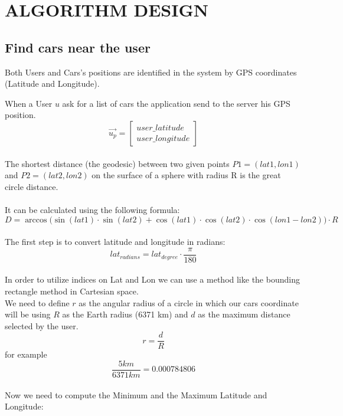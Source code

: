 \section{ALGORITHM DESIGN}
\subsection{Find cars near the user}
\label{algoritmo_posizione}
Both Users and Cars's positions are identified in the system by GPS coordinates (Latitude and Longitude).


\noindent When a User $u$ ask for a list of cars the application send to the server his GPS position. \begin{equation}
\vec{u_p} =\begin{bmatrix}user\_latitude \\ user\_longitude\end{bmatrix}
\end{equation}
\\
\noindent The shortest distance (the geodesic) between two given points $P1=(lat1, lon1)$ and $P2=(lat2, lon2)$ on the surface of a sphere with radius R is the great circle distance. 
\\\\
It can be calculated using the following formula:\\
\begin{equation}
D = \arccos\Big(
\sin(lat1) \cdot \sin(lat2) + \cos(lat1) \cdot \cos(lat2) \cdot \cos(lon1 - lon2)
\Big)\cdot R
\end{equation}
\\
\noindent The first step is to convert latitude and longitude in radians:\\
\begin{equation}
lat_{radians} = lat_{degree} \cdot \frac{\pi}{180}
\end{equation}
\\
In order to utilize indices on Lat and Lon we can use a method like the bounding rectangle method in Cartesian space.\\
\noindent We need to define $r$ as the angular radius of a circle in which our cars coordinate will be using $R$ as the Earth radius (6371 km) and $d$ as the maximum distance selected by the user.
\begin{equation}
	 r = \frac{d}{R}  
\end{equation}
for example $$ \frac{5 km}{6371 km} = 0.000784806$$
\\
\noindent Now we need to compute the Minimum and the Maximum Latitude and Longitude:
